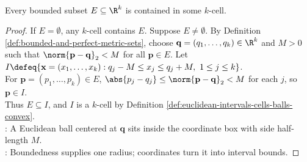 \begin{lemma} \label{lem:bounded-rk-set-contained-in-k-cell} \\
Every bounded subset $E\subseteq\R^k$ is contained in some $k$-cell.
\begin{proof}
If $E=\emptyset$, any $k$-cell contains $E$. Suppose $E\neq\emptyset$. By Definition \ref{def:bounded-and-perfect-metric-sets}, choose $\mathbf{q}=(q_1,\ldots,q_k)\in\R^k$ and $M>0$ such that $\norm{\mathbf{p}-\mathbf{q}}_2<M$ for all $\mathbf{p}\in E$. Let $I\defeq\{\mathbf{x}=(x_1,\ldots,x_k):q_j-M\leq x_j\leq q_j+M,\ 1\leq j\leq k\}$.\\
For $\mathbf{p}=(p_1,\ldots,p_k)\in E$, $\abs{p_j-q_j}\leq\norm{\mathbf{p}-\mathbf{q}}_2<M$ for each $j$, so $\mathbf{p}\in I$.\\
Thus $E\subseteq I$, and $I$ is a $k$-cell by Definition \ref{def:euclidean-intervals-cells-balls-convex}.\\
: A Euclidean ball centered at $\mathbf{q}$ sits inside the coordinate box with side half-length $M$.\\
: Boundedness supplies one radius; coordinates turn it into interval bounds.
\end{proof}
\end{lemma}


